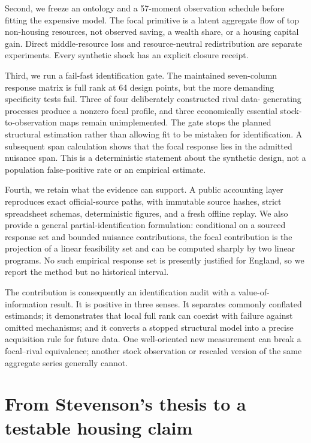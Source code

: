 \documentclass[11pt]{article}
\begin{document}
Second, we freeze an ontology and a 57-moment observation schedule before fitting
the expensive model. The focal primitive is a latent aggregate flow of top
non-housing resources, not observed saving, a wealth share, or a housing capital
gain. Direct middle-resource loss and resource-neutral redistribution are separate
experiments. Every synthetic shock has an explicit closure receipt.

Third, we run a fail-fast identification gate. The maintained seven-column
response matrix is full rank at 64 design points, but the more demanding
specificity tests fail. Three of four deliberately constructed rival data-
generating processes produce a nonzero focal profile, and three economically
essential stock-to-observation maps remain unimplemented. The gate stops the
planned structural estimation rather than allowing fit to be mistaken for
identification. A subsequent span calculation shows that the focal response lies
in the admitted nuisance span. This is a deterministic statement about the
synthetic design, not a population false-positive rate or an empirical estimate.

Fourth, we retain what the evidence can support. A public accounting layer
reproduces exact official-source paths, with immutable source hashes, strict
spreadsheet schemas, deterministic figures, and a fresh offline replay. We also
provide a general partial-identification formulation: conditional on a sourced
response set and bounded nuisance contributions, the focal contribution is the
projection of a linear feasibility set and can be computed sharply by two linear
programs. No such empirical response set is presently justified for England, so
we report the method but no historical interval.

The contribution is consequently an identification audit with a value-of-
information result. It is positive in three senses. It separates commonly
conflated estimands; it demonstrates that local full rank can coexist with failure
against omitted mechanisms; and it converts a stopped structural model into a
precise acquisition rule for future data. One well-oriented new measurement can
break a focal--rival equivalence; another stock observation or rescaled version of
the same aggregate series generally cannot.

\section{From Stevenson's thesis to a testable housing claim}
\label{sec:stevenson}
\end{document}
